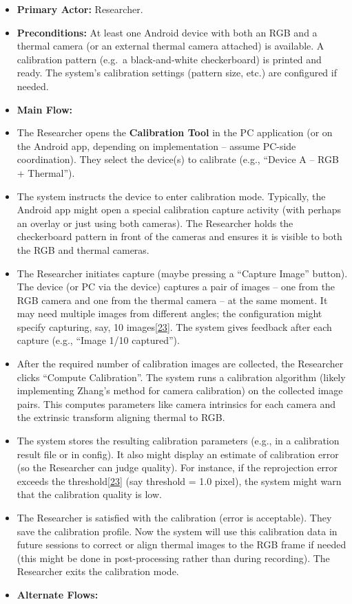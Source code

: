 \documentclass[12pt,a4paper]{article}
\begin{document}
\begin{itemize}
\item
  \textbf{Primary Actor:} Researcher.
\item
  \textbf{Preconditions:} At least one Android device with both an RGB and a thermal camera (or an external thermal camera attached) is available. A calibration pattern (e.g.~a black-and-white checkerboard) is printed and ready. The system's calibration settings (pattern size, etc.) are configured if needed.
\item
  \textbf{Main Flow:}
\item
  The Researcher opens the \textbf{Calibration Tool} in the PC application (or on the Android app, depending on implementation -- assume PC-side coordination). They select the device(s) to calibrate (e.g., ``Device A -- RGB + Thermal'').
\item
  The system instructs the device to enter calibration mode. Typically, the Android app might open a special calibration capture activity (with perhaps an overlay or just using both cameras). The Researcher holds the checkerboard pattern in front of the cameras and ensures it is visible to both the RGB and thermal cameras.
\item
  The Researcher initiates capture (maybe pressing a ``Capture Image'' button). The device (or PC via the device) captures a pair of images -- one from the RGB camera and one from the thermal camera -- at the same moment. It may need multiple images from different angles; the configuration might specify capturing, say, 10 images\href{https://github.com/buccancs/bucika_gsr/blob/7048f7f6a7536f5cd577ed2184800d3dad97fd08/protocol/config.json\#L54-L62}{{[}23{]}}. The system gives feedback after each capture (e.g., ``Image 1/10 captured'').
\item
  After the required number of calibration images are collected, the Researcher clicks ``Compute Calibration''. The system runs a calibration algorithm (likely implementing Zhang's method for camera calibration) on the collected image pairs. This computes parameters like camera intrinsics for each camera and the extrinsic transform aligning thermal to RGB.
\item
  The system stores the resulting calibration parameters (e.g., in a calibration result file or in config). It also might display an estimate of calibration error (so the Researcher can judge quality). For instance, if the reprojection error exceeds the threshold\href{https://github.com/buccancs/bucika_gsr/blob/7048f7f6a7536f5cd577ed2184800d3dad97fd08/protocol/config.json\#L54-L62}{{[}23{]}} (say threshold = 1.0 pixel), the system might warn that the calibration quality is low.
\item
  The Researcher is satisfied with the calibration (error is acceptable). They save the calibration profile. Now the system will use this calibration data in future sessions to correct or align thermal images to the RGB frame if needed (this might be done in post-processing rather than during recording). The Researcher exits the calibration mode.
\item
  \textbf{Alternate Flows:}\\


\end{itemize}
\end{document}
